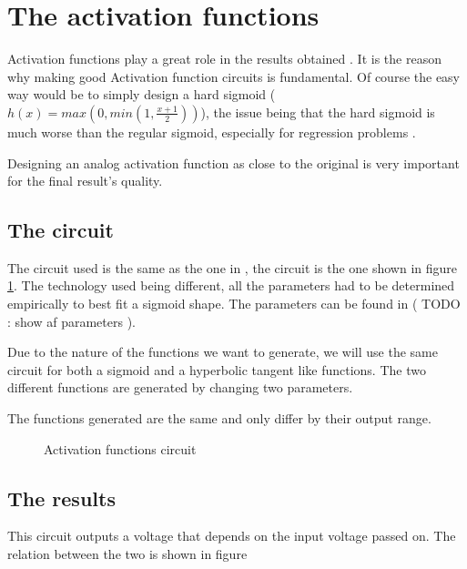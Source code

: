 \section{The activation functions}
\label{sec:af}

Activation functions play a great role in the results obtained \cite{af}. It is the reason why making good Activation function circuits is fundamental. Of course the easy way would be to simply design a hard sigmoid ($h(x)=max(0,min(1,\frac{x+1}{2}))$), the issue being that the hard sigmoid is much worse than the regular sigmoid, especially for regression problems \cite{hardSigm}.

Designing an analog activation function as close to the original is very important for the final result's quality.


\subsection{The circuit}

The circuit used is the same as the one in \cite{thesisRef}, the circuit is the one shown in figure \ref{fig:afCircuit}. The technology used being different, all the parameters had to be determined empirically to best fit a sigmoid shape. The parameters can be found in ( TODO : show af parameters ).

Due to the nature of the functions we want to generate, we will use the same circuit for both a sigmoid and a hyperbolic tangent like functions. The two different functions are generated by changing two parameters.

The functions generated are the same and only differ by their output range.

\begin{figure}[H]
\centering

\caption{Activation functions circuit}
\label{fig:afCircuit}
\end{figure}

\subsection{The results}

This circuit outputs a voltage that depends on the input voltage passed on. The relation between the two is shown in figure

